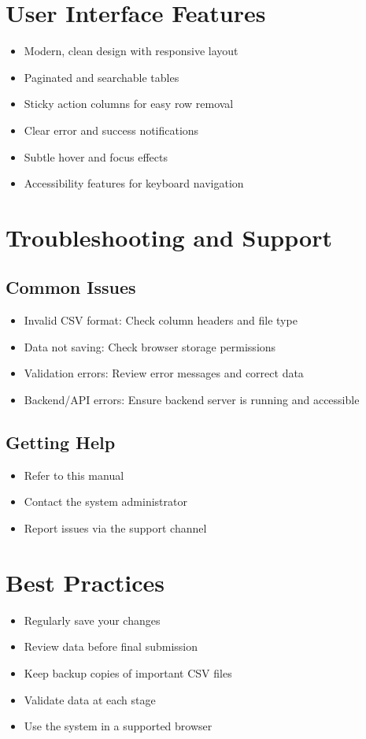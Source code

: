 \documentclass[12pt,a4paper]{article}
\begin{document}
\section{User Interface Features}
\begin{itemize}
    \item Modern, clean design with responsive layout
    \item Paginated and searchable tables
    \item Sticky action columns for easy row removal
    \item Clear error and success notifications
    \item Subtle hover and focus effects
    \item Accessibility features for keyboard navigation
\end{itemize}

\section{Troubleshooting and Support}
\subsection{Common Issues}
\begin{itemize}
    \item Invalid CSV format: Check column headers and file type
    \item Data not saving: Check browser storage permissions
    \item Validation errors: Review error messages and correct data
    \item Backend/API errors: Ensure backend server is running and accessible
\end{itemize}

\subsection{Getting Help}
\begin{itemize}
    \item Refer to this manual
    \item Contact the system administrator
    \item Report issues via the support channel
\end{itemize}

\section{Best Practices}
\begin{itemize}
    \item Regularly save your changes
    \item Review data before final submission
    \item Keep backup copies of important CSV files
    \item Validate data at each stage
    \item Use the system in a supported browser
\end{itemize}
\end{document}
